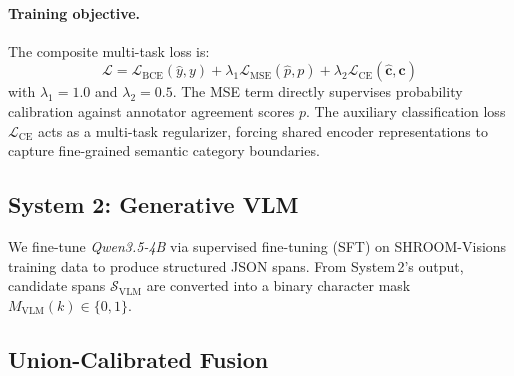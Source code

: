 \documentclass[11pt]{article}
\begin{document}
\paragraph{Training objective.}
The composite multi-task loss is:
\begin{equation}
    \mathcal{L} = \mathcal{L}_{\text{BCE}}(\hat{y}, y) + \lambda_1 \mathcal{L}_{\text{MSE}}(\hat{p}, p) + \lambda_2 \mathcal{L}_{\text{CE}}(\hat{\mathbf{c}}, \mathbf{c})
    \label{eq:loss}
\end{equation}
with $\lambda_1\!=\!1.0$ and $\lambda_2\!=\!0.5$. The MSE term directly supervises probability calibration against annotator agreement scores $p$. The auxiliary classification loss $\mathcal{L}_{\text{CE}}$ acts as a multi-task regularizer, forcing shared encoder representations to capture fine-grained semantic category boundaries.

\subsection{System 2: Generative VLM}

We fine-tune \textit{Qwen3.5-4B} \citep{yang2025qwen3,qwen3.5} via supervised fine-tuning (SFT) on SHROOM-Visions training data to produce structured JSON spans. From System\,2's output, candidate spans $\mathcal{S}_{\text{VLM}}$ are converted into a binary character mask $M_{\text{VLM}}(k) \in \{0,1\}$.

\subsection{Union-Calibrated Fusion}
\end{document}
